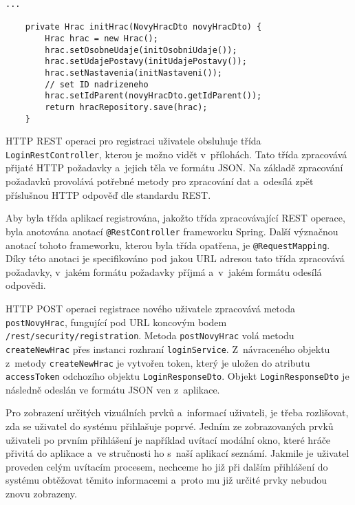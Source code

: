 \documentclass[twoside, 12pt]{article}
\begin{document}
{\begin{lstlisting}
...

    private Hrac initHrac(NovyHracDto novyHracDto) {
        Hrac hrac = new Hrac();
        hrac.setOsobneUdaje(initOsobniUdaje());
        hrac.setUdajePostavy(initUdajePostavy());
        hrac.setNastavenia(initNastaveni());
        // set ID nadrizeneho
        hrac.setIdParent(novyHracDto.getIdParent());
        return hracRepository.save(hrac);
    }
\end{lstlisting}

\vspace{10}

HTTP REST operaci pro registraci uživatele obsluhuje třída \texttt{LoginRestController},
kterou je možno vidět v~přílohách.
Tato třída zpracovává přijaté HTTP požadavky a~jejich těla ve formátu JSON.
Na základě zpracování požadavků provolává potřebné metody pro zpracování dat
a~odesílá zpět příslušnou HTTP odpověď dle standardu REST.

Aby byla třída aplikací registrována, jakožto třída zpracovávající REST operace,
byla anotována anotací \texttt{@RestController} frameworku Spring.
Další význačnou anotací tohoto frameworku, kterou byla třída opatřena, je \texttt{@RequestMapping}.
Díky této anotaci je specifikováno pod jakou URL adresou tato třída zpracovává požadavky,
v~jakém formátu požadavky příjmá a~v~jakém formátu odesílá odpovědi.

HTTP POST operaci registrace nového uživatele zpracovává metoda \texttt{postNovyHrac},
fungující pod URL koncovým bodem \texttt{/rest/security/registration}.
Metoda \texttt{postNovyHrac} volá metodu \texttt{createNewHrac} přes instanci rozhraní \texttt{loginService}.
Z~návraceného objektu z~metody \texttt{createNewHrac} je vytvořen token,
který je uložen do atributu \texttt{accessToken} odchozího objektu \texttt{LoginResponseDto}.
Objekt \texttt{LoginResponseDto} je následně odeslán ve formátu JSON ven z~aplikace.

\clearpage


Pro zobrazení určitých vizuálních prvků a~informací uživateli, je třeba rozlišovat,
zda se uživatel do systému přihlašuje poprvé. Jedním ze zobrazovaných prvků uživateli po prvním přihlášení je například uvítací modální okno,
které hráče přivitá do aplikace a~ve stručnosti ho s~naší aplikací seznámí.
Jakmile je uživatel proveden celým uvítacím procesem, nechceme ho již při dalším přihlášení do systému
obtěžovat těmito informacemi a~proto mu již určité prvky nebudou znovu zobrazeny.

}
\end{document}
